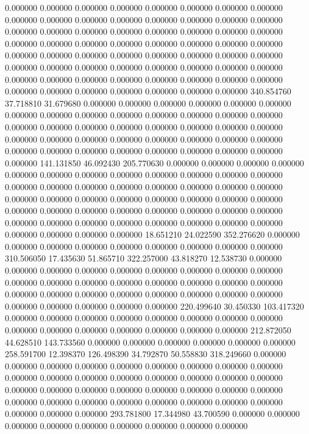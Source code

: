 0.000000 0.000000 0.000000
0.000000 0.000000 0.000000
0.000000 0.000000 0.000000
0.000000 0.000000 0.000000
0.000000 0.000000 0.000000
0.000000 0.000000 0.000000
0.000000 0.000000 0.000000
0.000000 0.000000 0.000000
0.000000 0.000000 0.000000
0.000000 0.000000 0.000000
0.000000 0.000000 0.000000
0.000000 0.000000 0.000000
0.000000 0.000000 0.000000
0.000000 0.000000 0.000000
0.000000 0.000000 0.000000
0.000000 0.000000 0.000000
0.000000 0.000000 0.000000
0.000000 0.000000 0.000000
0.000000 0.000000 0.000000
0.000000 0.000000 0.000000
0.000000 0.000000 0.000000
340.854760 37.718810 31.679680
0.000000 0.000000 0.000000
0.000000 0.000000 0.000000
0.000000 0.000000 0.000000
0.000000 0.000000 0.000000
0.000000 0.000000 0.000000
0.000000 0.000000 0.000000
0.000000 0.000000 0.000000
0.000000 0.000000 0.000000
0.000000 0.000000 0.000000
0.000000 0.000000 0.000000
0.000000 0.000000 0.000000
0.000000 0.000000 0.000000
0.000000 0.000000 0.000000
141.131850 46.092430 205.770630
0.000000 0.000000 0.000000
0.000000 0.000000 0.000000
0.000000 0.000000 0.000000
0.000000 0.000000 0.000000
0.000000 0.000000 0.000000
0.000000 0.000000 0.000000
0.000000 0.000000 0.000000
0.000000 0.000000 0.000000
0.000000 0.000000 0.000000
0.000000 0.000000 0.000000
0.000000 0.000000 0.000000
0.000000 0.000000 0.000000
0.000000 0.000000 0.000000
0.000000 0.000000 0.000000
0.000000 0.000000 0.000000
0.000000 0.000000 0.000000
18.651210 24.022590 352.276620
0.000000 0.000000 0.000000
0.000000 0.000000 0.000000
0.000000 0.000000 0.000000
310.506050 17.435630 51.865710
322.257000 43.818270 12.538730
0.000000 0.000000 0.000000
0.000000 0.000000 0.000000
0.000000 0.000000 0.000000
0.000000 0.000000 0.000000
0.000000 0.000000 0.000000
0.000000 0.000000 0.000000
0.000000 0.000000 0.000000
0.000000 0.000000 0.000000
0.000000 0.000000 0.000000
0.000000 0.000000 0.000000
220.499640 30.450330 103.417320
0.000000 0.000000 0.000000
0.000000 0.000000 0.000000
0.000000 0.000000 0.000000
0.000000 0.000000 0.000000
0.000000 0.000000 0.000000
212.872050 44.628510 143.733560
0.000000 0.000000 0.000000
0.000000 0.000000 0.000000
258.591700 12.398370 126.498390
34.792870 50.558830 318.249660
0.000000 0.000000 0.000000
0.000000 0.000000 0.000000
0.000000 0.000000 0.000000
0.000000 0.000000 0.000000
0.000000 0.000000 0.000000
0.000000 0.000000 0.000000
0.000000 0.000000 0.000000
0.000000 0.000000 0.000000
0.000000 0.000000 0.000000
0.000000 0.000000 0.000000
0.000000 0.000000 0.000000
0.000000 0.000000 0.000000
293.781800 17.344980 43.700590
0.000000 0.000000 0.000000
0.000000 0.000000 0.000000
0.000000 0.000000 0.000000
